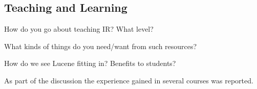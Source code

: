\subsection{Teaching and Learning}
\label{sec:teaching}







How do you go about teaching IR? What level?

What kinds of things do you need/want from such resources?


How do we see Lucene fitting in? Benefits to students?

\noindent {}

As part of the discussion the experience gained in several courses was reported.

